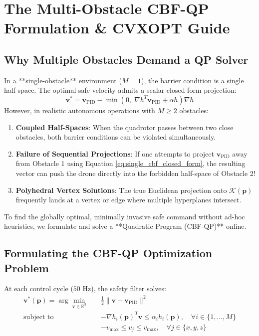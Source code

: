 \documentclass[11pt,a4paper]{article}
\begin{document}
\section{The Multi-Obstacle CBF-QP Formulation \& CVXOPT Guide}

\subsection{Why Multiple Obstacles Demand a QP Solver}
In a **single-obstacle** environment ($M = 1$), the barrier condition is a single half-space. The optimal safe velocity admits a scalar closed-form projection:
\begin{equation}
\mathbf{v}^* = \mathbf{v}_{\mathrm{PID}} - \min\left(0, \; \nabla h^T \mathbf{v}_{\mathrm{PID}} + \alpha h\right) \nabla h
\label{eq:single_cbf_closed_form}
\end{equation}
However, in realistic autonomous operations with $M \ge 2$ obstacles:
\begin{enumerate}
    \item \textbf{Coupled Half-Spaces}: When the quadrotor passes between two close obstacles, both barrier conditions can be violated simultaneously.
    \item \textbf{Failure of Sequential Projections}: If one attempts to project $\mathbf{v}_{\mathrm{PID}}$ away from Obstacle 1 using Equation \eqref{eq:single_cbf_closed_form}, the resulting vector can push the drone directly into the forbidden half-space of Obstacle 2!
    \item \textbf{Polyhedral Vertex Solutions}: The true Euclidean projection onto $\mathcal{K}(\mathbf{p})$ frequently lands at a vertex or edge where multiple hyperplanes intersect.
\end{enumerate}
To find the globally optimal, minimally invasive safe command without ad-hoc heuristics, we formulate and solve a **Quadratic Program (CBF-QP)** online.

\subsection{Formulating the CBF-QP Optimization Problem}
At each control cycle ($50\text{ Hz}$), the safety filter solves:
\begin{align}
\mathbf{v}^*(\mathbf{p}) = \arg\min_{\mathbf{v} \in \mathbb{R}^3} \quad & \frac{1}{2} \|\mathbf{v} - \mathbf{v}_{\mathrm{PID}}\|^2 \label{eq:cbf_qp_form} \\
\text{subject to} \quad & -\nabla h_i(\mathbf{p})^T \mathbf{v} \le \alpha_i h_i(\mathbf{p}), \quad \forall i \in \{1, \dots, M\} \nonumber \\
& -v_{\max} \le v_j \le v_{\max}, \quad \forall j \in \{x, y, z\} \nonumber
\end{align}
\end{document}
